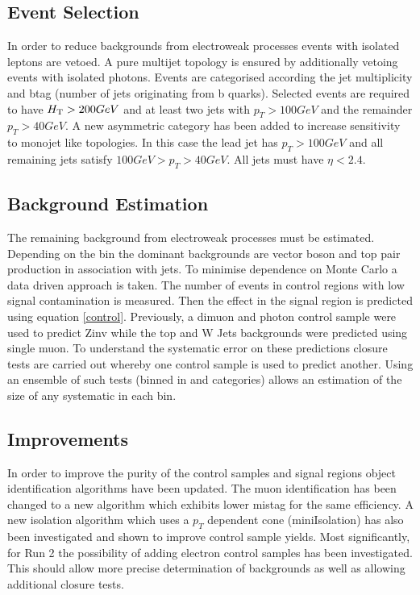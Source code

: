 \subsection{Event Selection}
In order to reduce backgrounds from electroweak processes events with isolated leptons are vetoed. A pure multijet topology is ensured by additionally vetoing events with isolated photons. Events are categorised according the jet multiplicity and btag (number of jets originating from b quarks). Selected events are required to have $\mbox{$H_\text{T}$} > 200 GeV$ and at least two jets with $p_T > 100GeV$ and the remainder $p_T > 40GeV$. A new asymmetric category has been added to increase sensitivity to monojet like topologies. In this case the lead jet has $p_T > 100 GeV$ and all remaining jets satisfy $100 GeV > p_T > 40GeV$. All jets must have $\eta < 2.4$.

\subsection{Background Estimation}
\label{sec:bkgd-est}
The remaining background from electroweak processes must be estimated. 
Depending on the bin the dominant backgrounds are vector boson 
and top pair production in association with jets. To minimise 
dependence on Monte Carlo a data driven approach is taken. 
The number of events in control regions with low signal contamination 
is measured. Then the effect in the signal region is predicted using 
equation \ref{control}. Previously, a dimuon and photon control sample 
were used to predict Zinv while the top and W Jets backgrounds were predicted 
using single muon. To understand the systematic error on these predictions 
closure tests are carried out whereby one control sample is used to predict another. 
Using an ensemble of such tests (binned in \scalht and categories) allows an estimation 
of the size of any systematic in each bin. 

\subsection{Improvements}

In order to improve the purity of the control samples and signal regions
object identification algorithms have been updated. The muon identification
has been changed to a new algorithm which exhibits lower mistag for the same
efficiency. A new isolation algorithm which uses a $p_T$ dependent cone (miniIsolation)
has also been investigated and shown to improve control sample yields. 
Most significantly, for Run 2 the possibility of adding electron control 
samples has been investigated. This should allow more precise determination 
of backgrounds as well as allowing additional closure tests.

